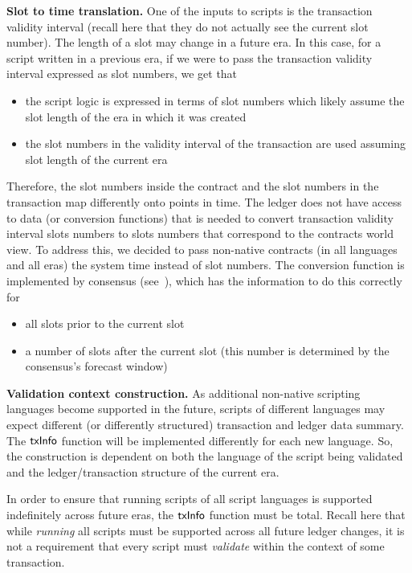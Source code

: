 \textbf{Slot to time translation.}
One of the inputs to scripts is the transaction validity interval (recall here that
they do not actually see the current slot number). The length of a
slot may change in a future era. In this case, for a script written in a previous
era, if we were to pass the transaction validity interval expressed as slot numbers,
we get that

\begin{itemize}
  \item the script logic is expressed in terms of slot numbers
  which likely assume the slot length of the era in which it was created
  \item the slot numbers in the validity interval of the transaction are used
  assuming slot length of the current era
\end{itemize}

Therefore, the slot numbers inside the contract and the slot numbers in the transaction
map differently onto points in time. The ledger does not have access to data (or conversion functions)
that is needed to convert transaction validity interval slots numbers to slots numbers
that correspond to the contracts world view. To address this, we decided to pass
non-native contracts (in all languages and all eras) the system time instead of slot numbers.
The conversion function is implemented by consensus (see~\cite{cardano_consensus}),
which has the information to do this correctly for

\begin{itemize}
  \item all slots prior to the current slot
  \item a number of slots after the current slot (this number is determined by
  the consensus's forecast window)
\end{itemize}

\textbf{Validation context construction.}
  As additional non-native scripting languages become supported in the future, scripts of different
  languages may expect different (or differently structured) transaction and ledger data summary.
  The $\mathsf{txInfo}$ function will be implemented differently
  for each new language. So, the construction is
  dependent on both the language of the script being validated and the ledger/transaction structure
  of the current era.

  In order to ensure that running scripts of all script languages is supported indefinitely across
  future eras, the $\mathsf{txInfo}$ function must be total.
  Recall here that while \emph{running} all scripts must be supported across
  all future ledger changes,
  it is not a requirement that every script must \emph{validate} within the context of some transaction.

